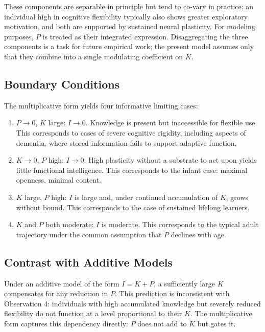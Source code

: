 \documentclass[11pt, a4paper]{article}
\begin{document}
These components are separable in principle but tend to co-vary in practice: an individual high in cognitive flexibility typically also shows greater exploratory motivation, and both are supported by sustained neural plasticity. For modeling purposes, $P$ is treated as their integrated expression. Disaggregating the three components is a task for future empirical work; the present model assumes only that they combine into a single modulating coefficient on $K$.

\subsection{Boundary Conditions}

The multiplicative form yields four informative limiting cases:

\begin{enumerate}
    \item $P \to 0$, $K$ large: $I \to 0$. Knowledge is present but inaccessible for flexible use. This corresponds to cases of severe cognitive rigidity, including aspects of dementia, where stored information fails to support adaptive function.
    \item $K \to 0$, $P$ high: $I \to 0$. High plasticity without a substrate to act upon yields little functional intelligence. This corresponds to the infant case: maximal openness, minimal content.
    \item $K$ large, $P$ high: $I$ is large and, under continued accumulation of $K$, grows without bound. This corresponds to the case of sustained lifelong learners.
    \item $K$ and $P$ both moderate: $I$ is moderate. This corresponds to the typical adult trajectory under the common assumption that $P$ declines with age.
\end{enumerate}

\subsection{Contrast with Additive Models}

Under an additive model of the form $I = K + P$, a sufficiently large $K$ compensates for any reduction in $P$. This prediction is inconsistent with Observation 4: individuals with high accumulated knowledge but severely reduced flexibility do not function at a level proportional to their $K$. The multiplicative form captures this dependency directly: $P$ does not add to $K$ but gates it.
\end{document}
